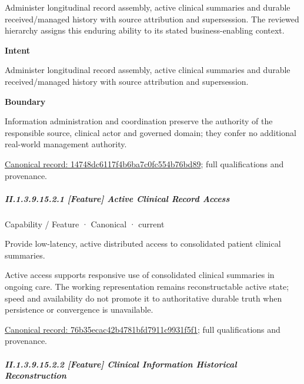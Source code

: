Administer longitudinal record assembly, active clinical summaries and durable received/managed history with source attribution and supersession. The reviewed hierarchy assigns this enduring ability to its stated business-enabling context.



\textbf{Intent}



Administer longitudinal record assembly, active clinical summaries and durable received/managed history with source attribution and supersession.



\textbf{Boundary}



Information administration and coordination preserve the authority of the responsible source, clinical actor and governed domain; they confer no additional real-world management authority.


{\footnotesize \href{../../../../continuum/strategy/capability/14748dc6117f4b6ba7c0fc554b76bd89.md}{Canonical record: 14748dc6117f4b6ba7c0fc554b76bd89}; full qualifications and provenance.}\par
\subparagraph*{II.1.3.9.15.2.1 [Feature] Active Clinical Record Access}
\label{navigation:II.1.3.9.15.2.1}

\label{element:76b35ecac42b4781bfd7911c9931f5f1}
{\small Capability / Feature · Canonical · current}\par

Provide low-latency, active distributed access to consolidated patient clinical summaries.



Active access supports responsive use of consolidated clinical summaries in ongoing care. The working representation remains reconstructable active state; speed and availability do not promote it to authoritative durable truth when persistence or convergence is unavailable.


{\footnotesize \href{../../../../continuum/strategy/capability/feature/76b35ecac42b4781bfd7911c9931f5f1.md}{Canonical record: 76b35ecac42b4781bfd7911c9931f5f1}; full qualifications and provenance.}\par
\subparagraph*{II.1.3.9.15.2.2 [Feature] Clinical Information Historical Reconstruction}
\label{navigation:II.1.3.9.15.2.2}

